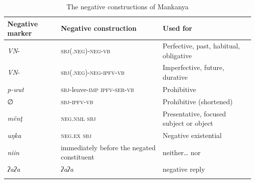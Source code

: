 \documentclass[output=paper,colorlinks,citecolor=brown]{langscibook}
\begin{document}
\begin{table}
\begin{tabularx}{\textwidth}{p{13mm}lQ}
\lsptoprule
Negative marker & Negative construction  & Used for\\
\midrule
\scshape \textit{VN}- &\textsc{sbj(.neg)-neg-vb} & Perfective, past, habitual, obligative\\
\tablevspace
\scshape \textit{VN}- &\scshape sbj(.neg)-neg-ipfv-vb & Imperfective, future, durative\\
\tablevspace
 \textit{p-wut} &\textsc{sbj-}leave\textsc{{}-imp ipfv-ser-vb} & Prohibitive\\
\tablevspace
 ∅ & \scshape sbj-ipfv-vb & Prohibitive (shortened)\\
\tablevspace
 \textit{mënţ} &\scshape neg.nml sbj & Presentative, focused subject or object\\
\tablevspace
 \textit{uŋka} &\scshape neg.ex sbj & Negative existential\\
\tablevspace
 \textit{niin} &immediately before the negated constituent & neither… nor \\
\tablevspace
 \textit{ʔaʔa} &  \textit{ʔaʔa}& negative reply\\
\lspbottomrule
\end{tabularx}
\caption{The negative constructions of Mankanya}
\label{tab:mank:4}
\end{table}

\newpage
\end{document}
